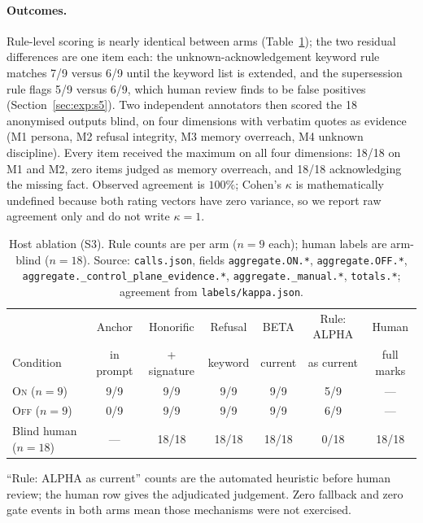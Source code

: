 \paragraph{Outcomes.} Rule-level scoring is nearly identical between arms
(Table~\ref{tab:host}); the two residual differences are one item each: the
unknown-acknowledgement keyword rule matches 7/9 versus 6/9 until the keyword
list is extended, and the supersession rule flags 5/9 versus 6/9, which human
review finds to be false positives (Section~\ref{sec:exp:s5}). Two independent
annotators then scored the 18 anonymised outputs blind, on four dimensions with
verbatim quotes as evidence (M1 persona, M2 refusal integrity, M3 memory
overreach, M4 unknown discipline). Every item received the maximum on all four
dimensions: 18/18 on M1 and M2, zero items judged as memory overreach, and 18/18
acknowledging the missing fact. Observed agreement is $100\%$; Cohen's $\kappa$
is mathematically undefined because both rating vectors have zero variance, so we
report raw agreement only and do not write $\kappa=1$.

\begin{table}[t]
\centering\footnotesize
\caption{Host ablation (S3). Rule counts are per arm ($n=9$ each); human labels
are arm-blind ($n=18$). Source: \texttt{calls.json}, fields
\texttt{aggregate.ON.*}, \texttt{aggregate.OFF.*},
\texttt{aggregate.\allowbreak{}\_\allowbreak{}control\_\allowbreak{}plane\_\allowbreak{}evidence.\allowbreak{}*}, \texttt{aggregate.\allowbreak{}\_\allowbreak{}manual.\allowbreak{}*},
\texttt{totals.*}; agreement from \texttt{labels/kappa.json}.}
\label{tab:host}
\begin{tabular}{@{}l cccc cc@{}}
\toprule
 & Anchor & Honorific & Refusal & BETA & Rule: ALPHA & Human \\
Condition & in prompt & + signature & keyword & current & as current & full marks \\
\midrule
\textsc{On} ($n=9$) & 9/9 & 9/9 & 9/9 & 9/9 & 5/9 & --- \\
\textsc{Off} ($n=9$) & 0/9 & 9/9 & 9/9 & 9/9 & 6/9 & --- \\
Blind human ($n=18$) & --- & 18/18 & 18/18 & 18/18 & 0/18 & 18/18 \\
\bottomrule
\end{tabular}

\vspace{2pt}
\raggedright\scriptsize
``Rule: ALPHA as current'' counts are the automated heuristic before human
review; the human row gives the adjudicated judgement. Zero fallback and zero
gate events in both arms mean those mechanisms were not exercised.
\end{table}

